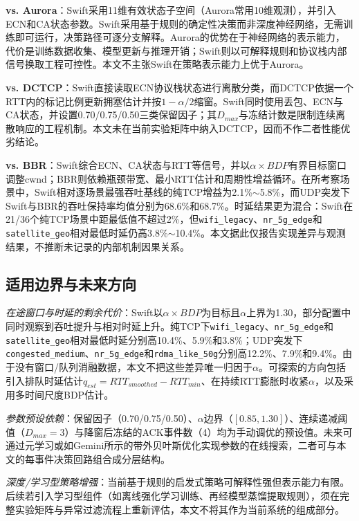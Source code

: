 \documentclass[10pt,twocolumn]{article}
\begin{document}
\textbf{vs. Aurora\cite{aurora}}：Swift采用11维有效状态子空间（Aurora常用10维观测），并引入ECN和CA状态参数。Swift采用基于规则的确定性决策而非深度神经网络，无需训练即可运行，决策路径可逐分支解释。Aurora的优势在于神经网络的表示能力，代价是训练数据收集、模型更新与推理开销；Swift则以可解释规则和协议栈内部信号换取工程可控性。本文不主张Swift在策略表示能力上优于Aurora。

\textbf{vs. DCTCP\cite{dctcp}}：Swift直接读取ECN协议栈状态进行离散分类，而DCTCP依据一个RTT内的标记比例更新拥塞估计并按$1-\alpha/2$缩窗。Swift同时使用丢包、ECN与CA状态，并设置0.70/0.75/0.50三类保留因子；其$D_{max}$与冻结计数是限制连续离散响应的工程机制。本文未在当前实验矩阵中纳入DCTCP，因而不作二者性能优劣结论。

\textbf{vs. BBR\cite{bbr}}：Swift综合ECN、CA状态与RTT等信号，并以$\alpha \times BDP$有界目标窗口调整cwnd；BBR则依赖瓶颈带宽、最小RTT估计和周期性增益循环。在所考察场景中，Swift相对逐场景最强吞吐基线的纯TCP增益为2.1\%$\sim$5.8\%，而UDP突发下Swift与BBR的吞吐保持率均值分别为68.6\%和68.7\%。时延结果更为混合：Swift在21/36个纯TCP场景中距最低值不超过2\%，但\texttt{wifi\_legacy}、\texttt{nr\_5g\_edge}和\texttt{satellite\_geo}相对最低时延仍高3.8\%$\sim$10.4\%。本文据此仅报告实现差异与观测结果，不推断未记录的内部机制因果关系。

\subsection{适用边界与未来方向}
\label{subsec:limitations}

\textit{在途窗口与时延的剩余代价}：Swift以$\alpha\times BDP$为目标且$\alpha$上界为1.30，部分配置中同时观察到吞吐提升与相对时延上升。纯TCP下\texttt{wifi\_legacy}、\texttt{nr\_5g\_edge}和\texttt{satellite\_geo}相对最低时延分别高10.4\%、5.9\%和3.8\%；UDP突发下\texttt{congested\_medium}、\texttt{nr\_5g\_edge}和\texttt{rdma\_like\_50g}分别高12.2\%、7.9\%和9.4\%。由于没有窗口/队列消融数据，本文不把这些差异唯一归因于$\alpha$。可探索的方向包括引入排队时延估计$q_{est}=RTT_{smoothed}-RTT_{min}$、在持续RTT膨胀时收紧$\alpha$，以及采用多时间尺度BDP估计。

\textit{参数预设依赖}：保留因子（0.70/0.75/0.50）、$\alpha$边界（$[0.85,1.30]$）、连续递减阈值（$D_{max}=3$）与降窗后冻结的ACK事件数（4）均为手动调优的预设值。未来可通过元学习\cite{meta_learning}或如Gemini\cite{gemini}所示的带外贝叶斯优化实现参数的在线搜索，二者可与本文的每事件决策回路组合成分层结构。

\textit{深度/学习型策略增强}：当前基于规则的启发式策略可解释性强但表示能力有限。后续若引入学习型组件（如离线强化学习训练、再经模型蒸馏提取规则），须在完整实验矩阵与异常过滤流程上重新评估，本文不将其作为当前系统的组成部分。
\end{document}
